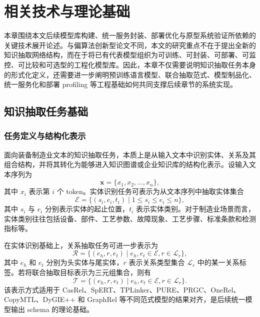\chapter{相关技术与理论基础}

本章围绕本文后续模型库构建、统一服务封装、部署优化与原型系统验证所依赖的关键技术展开论述。与偏算法创新型论文不同，本文的研究重点不在于提出全新的知识抽取网络结构，而在于将已有代表模型组织为可训练、可封装、可部署、可监控、可比较和可选型的工程化模型库。因此，本章不仅需要说明知识抽取任务本身的形式化定义，还需要进一步阐明预训练语言模型、联合抽取范式、模型制品化、统一服务化和部署 profiling 等工程基础如何共同支撑后续章节的系统实现。

\section{知识抽取任务基础}
\subsection{任务定义与结构化表示}
面向装备制造业文本的知识抽取任务，本质上是从输入文本中识别实体、关系及其组合结构，并将其转化为能够进入知识图谱或企业知识库的结构化表示。设输入文本序列为
\begin{equation}
\mathbf{x}=\{x_{1},x_{2},\ldots,x_{n}\},
\end{equation}
其中 $x_i$ 表示第 $i$ 个 token。实体识别任务可表示为从文本序列中抽取实体集合
\begin{equation}
\mathcal{E}=\{(s_i,e_i,t_i)\mid 1\leq s_i\leq e_i\leq n\},
\end{equation}
其中 $s_i$ 与 $e_i$ 分别表示实体的起止位置，$t_i$ 表示实体类别。对于制造业场景而言，实体类别往往包括设备、部件、工艺参数、故障现象、工艺步骤、标准条款和检测指标等。

在实体识别基础上，关系抽取任务可进一步表示为
\begin{equation}
\mathcal{R}=\{(e_h,r,e_t)\mid e_h,e_t\in\mathcal{E},r\in\mathcal{L}_{r}\},
\end{equation}
其中 $e_h$ 和 $e_t$ 分别为头实体与尾实体，$r$ 表示关系类型集合 $\mathcal{L}_{r}$ 中的某一关系标签。若将联合抽取目标表示为三元组集合，则有
\begin{equation}
\mathcal{T}=\{(e_h,r,e_t)\mid e_h,e_t\in\mathcal{E}, r\in\mathcal{L}_{r}\}.
\end{equation}
该表示方式适用于 CasRel、SpERT、TPLinker、PURE、PRGC、OneRel、CopyMTL、DyGIE++ 和 GraphRel 等不同范式模型的结果对齐，是后续统一模型输出 schema 的理论基础。

